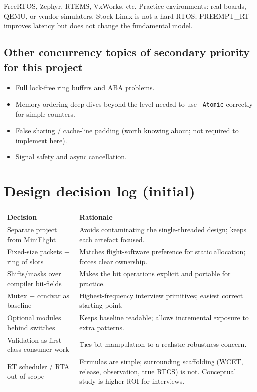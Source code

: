 \documentclass[11pt,a4paper]{article}
\begin{document}
FreeRTOS, Zephyr, RTEMS, VxWorks, etc.  
Practice environments: real boards, QEMU, or vendor simulators.  
Stock Linux is not a hard RTOS; PREEMPT\_RT improves latency but does not change the fundamental model.

\subsection{Other concurrency topics of secondary priority for this project}

\begin{itemize}[leftmargin=*]
    \item Full lock-free ring buffers and ABA problems.
    \item Memory-ordering deep dives beyond the level needed to use \texttt{\_Atomic} correctly for simple counters.
    \item False sharing / cache-line padding (worth knowing about; not required to implement here).
    \item Signal safety and async cancellation.
\end{itemize}

\section{Design decision log (initial)}
\label{sec:decisions}

\begin{center}
\begin{tabular}{@{}p{}p{}@{}}
\toprule
\textbf{Decision} & \textbf{Rationale} \\
\midrule
Separate project from MiniFlight & Avoids contaminating the single-threaded design; keeps each artefact focused. \\
Fixed-size packets + ring of slots & Matches flight-software preference for static allocation; forces clear ownership. \\
Shifts/masks over compiler bit-fields & Makes the bit operations explicit and portable for practice. \\
Mutex + condvar as baseline & Highest-frequency interview primitives; easiest correct starting point. \\
Optional modules behind switches & Keeps baseline readable; allows incremental exposure to extra patterns. \\
Validation as first-class consumer work & Ties bit manipulation to a realistic robustness concern. \\
RT scheduler / RTA out of scope & Formulas are simple; surrounding scaffolding (WCET, release, observation, true RTOS) is not. Conceptual study is higher ROI for interviews. \\
\bottomrule
\end{tabular}
\end{center}
\end{document}
